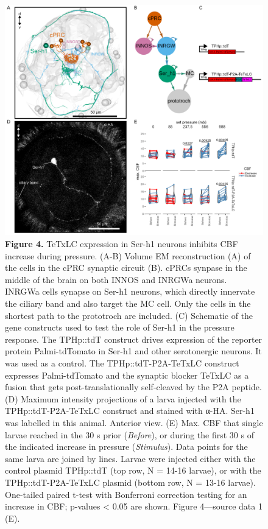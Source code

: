 \documentclass[
  11pt,
]{article}
\begin{document}
\begin{figure}[H]

{\centering \includegraphics[width=1\textwidth,height=\textheight]{Figures/Figure4.png}

}

\caption{\textbf{Figure 4.} TeTxLC expression in Ser-h1 neurons inhibits
CBF increase during pressure. (A-B) Volume EM reconstruction (A) of the
cells in the cPRC synaptic circuit (B). cPRCs synpase in the middle of
the brain on both INNOS and INRGWa neurons. INRGWa cells synapse on
Ser-h1 neurons, which directly innervate the ciliary band and also
target the MC cell. Only the cells in the shortest path to the
prototroch are included. (C) Schematic of the gene constructs used to
test the role of Ser-h1 in the pressure response. The TPHp::tdT
construct drives expression of the reporter protein Palmi-tdTomato in
Ser-h1 and other serotonergic neurons. It was used as a control. The
TPHp::tdT-P2A-TeTxLC construct expresses Palmi-tdTomato and the synaptic
blocker TeTxLC as a fusion that gets post-translationally self-cleaved
by the P2A peptide. (D) Maximum intensity projections of a larva
injected with the TPHp::tdT-P2A-TeTxLC construct and stained with α-HA.
Ser-h1 was labelled in this animal. Anterior view. (E) Max. CBF that
single larvae reached in the 30 s prior (\emph{Before}), or during the
first 30 s of the indicated increase in pressure (\emph{Stimulus}). Data
points for the same larva are joined by lines. Larvae were injected
either with the control plasmid TPHp::tdT (top row, N = 14-16 larvae),
or with the TPHp::tdT-P2A-TeTxLC plasmid (bottom row, N = 13-16 larvae).
One-tailed paired t-test with Bonferroni correction testing for an
increase in CBF; p-values \textless{} 0.05 are shown. Figure 4---source
data 1 (E).}

\end{figure}%
\end{document}
